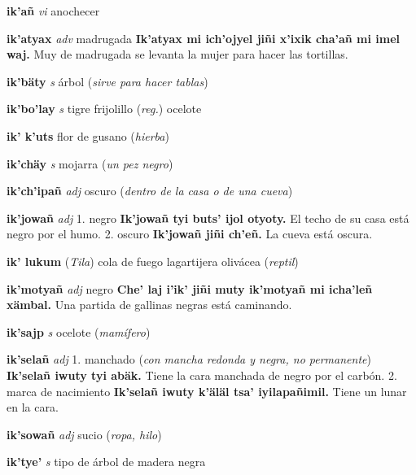 \documentclass[10pt]{scrbook}
\newcommand{\entry}[1]{\textbf{#1}}
\newcommand{\onedefinition}[1]{#1.}
\newcommand{\partofspeech}[1]{\textit{#1}}
\newcommand{\spanishtranslation}[1]{#1}
\newcommand{\clarification}[1]{(\textit{#1})}
\newcommand{\cholexample}[1]{\textbf{#1}}
\newcommand{\exampletranslation}[1]{#1}
\newcommand{\relevantdialect}[1]{(\textit{#1})}
\begin{document}
\begin{multicols}{2}
\entry{ik'añ}
\partofspeech{vi}
\spanishtranslation{anochecer}

\entry{ik'atyax}
\partofspeech{adv}
\spanishtranslation{madrugada}
\cholexample{Ik'atyax mi ich'ojyel jiñi x'ixik cha'añ mi imel waj.}
\exampletranslation{Muy de madrugada se levanta la mujer para hacer las tortillas.}

\entry{ik'bäty}
\partofspeech{s}
\spanishtranslation{árbol}
\clarification{sirve para hacer tablas}

\entry{ik'bo'lay}
\partofspeech{s}
\spanishtranslation{tigre frijolillo}
\clarification{reg.}
\spanishtranslation{ocelote}

\entry{ik' k'uts}
\spanishtranslation{flor de gusano}
\clarification{hierba}

\entry{ik'chäy}
\partofspeech{s}
\spanishtranslation{mojarra}
\clarification{un pez negro}

\entry{ik'ch'ipañ}
\partofspeech{adj}
\spanishtranslation{oscuro}
\clarification{dentro de la casa o de una cueva}

\entry{ik'jowañ}
\partofspeech{adj}
\onedefinition{1}
\spanishtranslation{negro}
\cholexample{Ik'jowañ tyi buts' ijol otyoty.}
\exampletranslation{El techo de su casa está negro por el humo.}
\onedefinition{2}
\spanishtranslation{oscuro}
\cholexample{Ik'jowañ jiñi ch'eñ.}
\exampletranslation{La cueva está oscura.}

\entry{ik' lukum}
\relevantdialect{Tila}
\spanishtranslation{cola de fuego}
\spanishtranslation{lagartijera olivácea}
\clarification{reptil}

\entry{ik'motyañ}
\partofspeech{adj}
\spanishtranslation{negro}
\cholexample{Che' laj i'ik' jiñi muty ik'motyañ mi icha'leñ xämbal.}
\exampletranslation{Una partida de gallinas negras está caminando.}

\entry{ik'sajp}
\partofspeech{s}
\spanishtranslation{ocelote}
\clarification{mamífero}

\entry{ik'selañ}
\partofspeech{adj}
\onedefinition{1}
\spanishtranslation{manchado}
\clarification{con mancha redonda y negra, no permanente}
\cholexample{Ik'selañ iwuty tyi abäk.}
\exampletranslation{Tiene la cara manchada de negro por el carbón.}
\onedefinition{2}
\spanishtranslation{marca de nacimiento}
\cholexample{Ik'selañ iwuty k'äläl tsa' iyilapañimil.}
\exampletranslation{Tiene un lunar en la cara.}

\entry{ik'sowañ}
\partofspeech{adj}
\spanishtranslation{sucio}
\clarification{ropa, hilo}

\entry{ik'tye'}
\partofspeech{s}
\spanishtranslation{tipo de árbol de madera negra}


\end{multicols}
\end{document}
